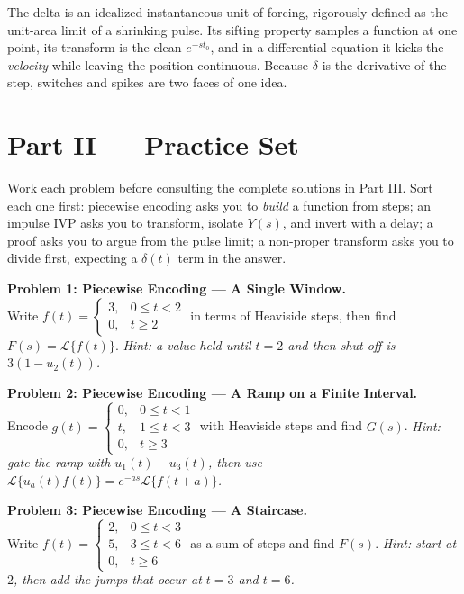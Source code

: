 \documentclass[11pt]{article}
\begin{document}
\begin{conceptbox}
The delta is an \textcolor{accentorange}{idealized instantaneous unit of forcing}, rigorously defined as the unit-area limit of a shrinking pulse. Its \textcolor{accentorange}{sifting property samples a function at one point}, its transform is the clean $e^{-st_0}$, and in a differential equation it kicks the \emph{velocity} while leaving the position continuous. Because $\delta$ is the derivative of the step, switches and spikes are two faces of one idea.
\end{conceptbox}

\clearpage
{}
{}
\section*{Part II --- Practice Set}

Work each problem before consulting the complete solutions in Part III. Sort each one first: piecewise encoding asks you to \emph{build} a function from steps; an impulse IVP asks you to transform, isolate $Y(s)$, and invert with a delay; a proof asks you to argue from the pulse limit; a non-proper transform asks you to divide first, expecting a $\delta(t)$ term in the answer.

\bigskip
\noindent\textbf{Problem 1: Piecewise Encoding --- A Single Window.}\\[2pt]
Write $f(t) = \begin{cases} 3, & 0 \le t < 2 \\ 0, & t \ge 2 \end{cases}$ in terms of Heaviside steps, then find $F(s) = \mathcal{L}\{f(t)\}$.
\textit{Hint: a value held until $t = 2$ and then shut off is $3(1 - u_2(t))$.}

\bigskip
\noindent\textbf{Problem 2: Piecewise Encoding --- A Ramp on a Finite Interval.}\\[2pt]
Encode $g(t) = \begin{cases} 0, & 0 \le t < 1 \\ t, & 1 \le t < 3 \\ 0, & t \ge 3 \end{cases}$ with Heaviside steps and find $G(s)$.
\textit{Hint: gate the ramp with $u_1(t) - u_3(t)$, then use $\mathcal{L}\{u_a(t)f(t)\} = e^{-as}\mathcal{L}\{f(t+a)\}$.}

\bigskip
\noindent\textbf{Problem 3: Piecewise Encoding --- A Staircase.}\\[2pt]
Write $f(t) = \begin{cases} 2, & 0 \le t < 3 \\ 5, & 3 \le t < 6 \\ 0, & t \ge 6 \end{cases}$ as a sum of steps and find $F(s)$.
\textit{Hint: start at $2$, then add the jumps that occur at $t = 3$ and $t = 6$.}
\end{document}
